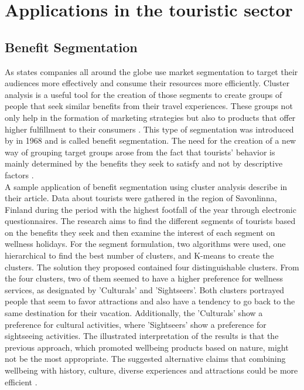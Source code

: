 \section{Applications in the touristic sector}
\subsection{Benefit Segmentation}
As \textcite{data-drivenSegmentation} states companies all around the globe use market segmentation to target their audiences more effectively and consume their resources more efficiently. Cluster analysis is a useful tool for the creation of those segments to create groups of people that seek similar benefits from their travel experiences. These groups not only help in the formation of marketing strategies but also to products that offer higher fulfillment to their consumers \autocite{data-drivenSegmentation}. This type of segmentation was introduced by \textcite{Haley} in 1968 and is called benefit segmentation. The need for the creation of a new way of grouping target groups arose from the fact that tourists' behavior is mainly determined by the benefits they seek to satisfy and not by descriptive factors \autocite[31]{Haley}. \\
A sample application of benefit segmentation using cluster analysis describe \textcite{finland} in their article. Data about tourists were gathered in the region of Savonlinna, Finland during the period with the highest footfall of the year through electronic questionnaires. The research aims to find the different segments of tourists based on the benefits they seek and then examine the interest of each segment on wellness holidays. For the segment formulation, two algorithms were used, one hierarchical to find the best number of clusters, and K-means to create the clusters. The solution they proposed contained four distinguishable clusters. From the four clusters, two of them seemed to have a higher preference for wellness services, as designated by \textcite{finland} 'Culturals' and 'Sightseers'. Both clusters portrayed people that seem to favor attractions and also have a tendency to go back to the same destination for their vacation. Additionally, the 'Culturals' show a preference for cultural activities, where 'Sightseers'  show a preference for sightseeing activities. The illustrated interpretation of the results is that the previous approach, which promoted wellbeing products based on nature, might not be the most appropriate. The suggested alternative claims that combining wellbeing with history, culture, diverse experiences and attractions could be more efficient \autocite[308-312]{finland}.